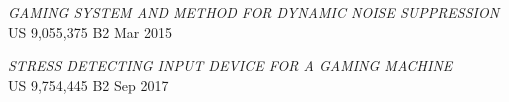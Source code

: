 \section{}

\vspace{8pt} %

{\sl GAMING SYSTEM AND METHOD FOR DYNAMIC NOISE SUPPRESSION} \\
US 9,055,375 B2 \hfill Mar 2015

{\sl STRESS DETECTING INPUT DEVICE FOR A GAMING MACHINE} \\
US 9,754,445 B2 \hfill Sep 2017